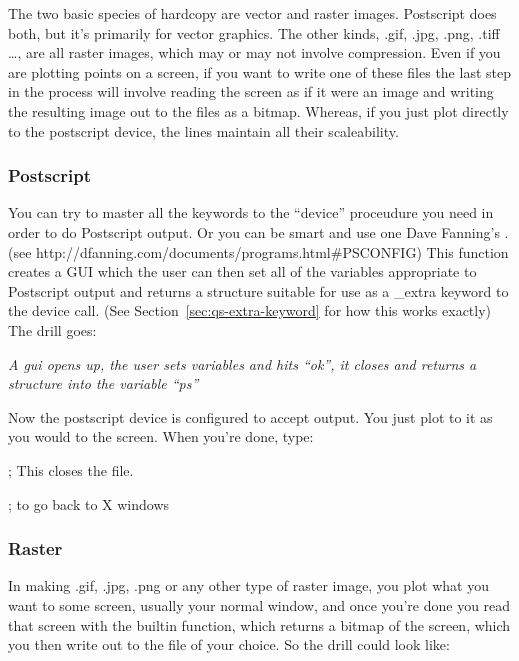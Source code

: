   The two basic species of hardcopy are vector and raster
  images. Postscript does both, but it's primarily for vector
  graphics. The other kinds, .gif, .jpg, .png, .tiff \ldots, are all
  raster images, which may or may not involve compression. Even if you
  are plotting points on a screen, if you want to write one of these
  files the last step in the process will involve reading the screen
  as if it were an image and writing the resulting image out to the
  files as a bitmap. Whereas, if you just plot directly to the
  postscript device, the lines maintain all their scaleability.

   \subsubsection{Postscript}
        
        You can try to master all the keywords to the ``device''
  proceudure you need in order to do Postscript output. Or you can be
  smart and use one Dave Fanning's . (see
  http://dfanning.com/documents/programs.html\#PSCONFIG) This function
  creates a GUI which the user can then set all of the variables
  appropriate to Postscript output and returns a structure suitable
  for use as a \_extra keyword to the device call. (See
  Section~\ref{sec:qs-extra-keyword} for how this works exactly) The
  drill goes:


   \textit{ A gui opens up, the user sets variables and hits ``ok'',
   it closes and returns a structure into the variable ``ps''}



   Now the postscript device is configured to accept output. You just
  plot to it as you would to the screen. When you're done, type:

   ; This closes the file.

    ; to go back to X windows

  
   \subsubsection{Raster}

    In making .gif, .jpg, .png or any other type of raster image, you
  plot what you want to some screen, usually your normal window, and
  once you're done you read that screen with the  builtin
  function, which returns a bitmap of the screen, which you then write
  out to the file of your choice. So the drill could look like:

